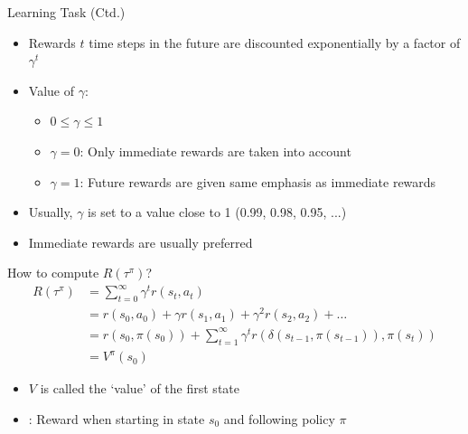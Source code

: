 \begin{frame}{Learning Task (Ctd.)}{}
	\begin{itemize}
		\item Rewards $t$ time steps in the future are discounted exponentially by a factor of $\gamma^t$
		\item Value of $\gamma$:
		\begin{itemize}
			\item $0 \le \gamma \le 1$
			\item $\gamma = 0$: Only immediate rewards are taken into account
			\item $\gamma = 1$: Future rewards are given same emphasis as immediate rewards
		\end{itemize}
		\item Usually, $\gamma$ is set to a value close to 1 (0.99, 0.98, 0.95, ...)
		\item Immediate rewards are usually preferred
	\end{itemize}
\end{frame}


\begin{frame}{How to compute $R(\tau^{\pi})$?}{}
	\vspace*{-8mm}
	\begin{align*}
		R(\tau^{\pi}) 	&= \sum_{t=0}^{\infty} \gamma^t r(s_t, a_t) \\
					&= r(s_0, a_0) + \gamma r(s_1, a_1) + \gamma^2 r(s_2, a_2) + \dots \\
					&= r(s_0, \pi(s_0)) + \sum_{t=1}^{\infty} \gamma^t r(\delta(s_{t-1}, \pi(s_{t-1})), \pi(s_t)) \\
					&= V^{\pi}(s_0)
	\end{align*}

	\vspace*{-2mm}
	\begin{itemize}
		\item $V$ is called the `value' of the first state
		\item {}: Reward when starting in state $s_0$ and following policy $\pi$
	\end{itemize}
\end{frame}


